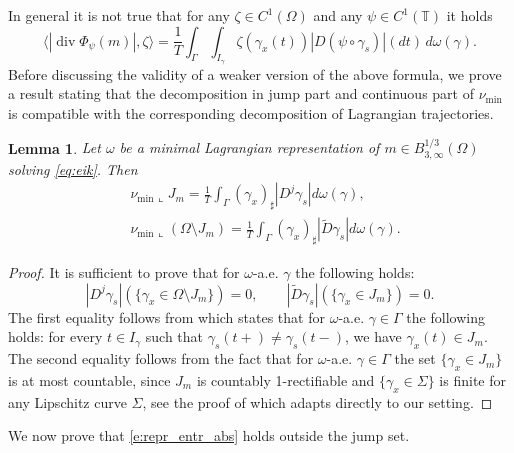 \documentclass[fleqn
]{article}
\numberwithin{equation}{section}
\newcommand{\T}{{\mathbb T}}
\DeclareMathOperator{\dv}{div}
\newtheorem{lem}[thm]{Lemma}
\theoremstyle{definition}
\begin{document}
In general it is not true that for any $\zeta\in C^1(\Omega)$ and any $\psi \in C^1(\T)$ it holds
\begin{equation}\label{e:repr_entr_abs}
\langle |\dv\Phi_\psi(m)|,\zeta\rangle
=\frac1T\int_{\Gamma}  \int_{I_\gamma}\zeta(\gamma_x(t))|D(\psi\circ\gamma_s)|(dt)\, d\omega(\gamma).
\end{equation}
Before discussing the validity of a weaker version of the above formula, we prove a result stating that the decomposition in jump part and continuous part of $\nu_{\min}$ is compatible with the corresponding decomposition of Lagrangian trajectories.
\begin{lem}\label{l:jumpLE}
Let $\omega$ be a minimal Lagrangian representation of $m \in B^{1/3}_{3,\infty}(\Omega)$ solving \eqref{eq:eik}.
Then 
\[
\begin{split}
&\nu_{\min}\llcorner J_m =  \frac1T \int_\Gamma (\gamma_x)_\sharp |D^j\gamma_s| d\omega (\gamma), \\
&\nu_{\min}\llcorner (\Omega \setminus J_m) =  \frac1T \int_\Gamma (\gamma_x)_\sharp |\tilde D\gamma_s| d\omega (\gamma).
\end{split}
\]
\end{lem}
\begin{proof}
It is sufficient to prove that for $\omega$-a.e. $\gamma$ the following holds:
\[
|D^j\gamma_s|(\{\gamma_x \in \Omega \setminus J_m\})=0, \qquad |\tilde D\gamma_s|(\{ \gamma_x \in J_m\})=0.
\]
The first equality follows from
\cite[Lemma~3.5]{marconi21ellipse}
which states that for $\omega$-a.e. $\gamma \in \Gamma$ the following holds: for every $t \in I_\gamma$ such that $\gamma_s(t+)\ne \gamma_s(t-)$, we have
$\gamma_x(t) \in J_m$.
%
The second equality follows from the fact that for $\omega$-a.e. $\gamma\in \Gamma$ the set $\{\gamma_x \in J_m\}$ is at most countable,
since $J_m$ is 
countably 1-rectifiable and $\lbrace\gamma_x\in \Sigma\rbrace$ is finite for any Lipschitz curve $\Sigma$, 
see the proof of \cite[Lemma~3.4]{CHLM22} which adapts directly to our setting.
\end{proof}

We now prove that \eqref{e:repr_entr_abs} holds outside the jump set.
\end{document}

